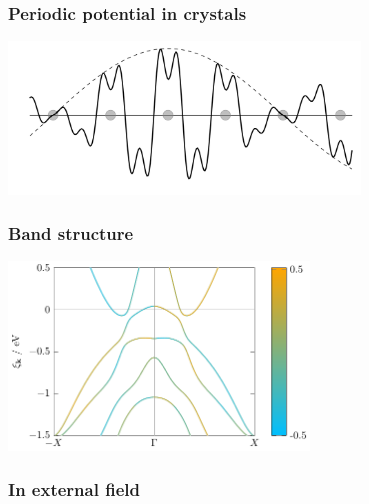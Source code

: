 \documentclass{beamer}
\begin{document}
\begin{frame}
\frametitle{Periodic potential in crystals}

\begin{center}
    \includegraphics[width=0.7\textwidth]{lattices/bloch.png}
\end{center}

\end{frame}

\begin{frame}
\frametitle{Band structure}

\begin{center}
    \includegraphics[width=0.6\textwidth]{bands/qe-output-example.pdf}
\end{center}

\end{frame}

\begin{frame}
\frametitle{In external field}



\end{frame}
\end{document}
